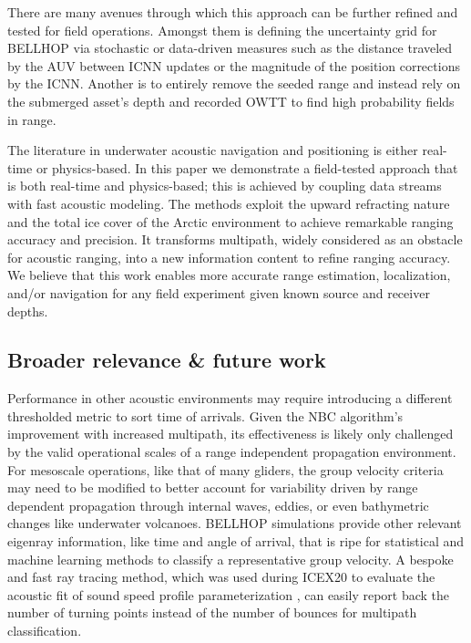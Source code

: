 There are many avenues through which this approach can be further refined and tested for field operations.
Amongst them is defining the uncertainty grid for BELLHOP via stochastic or data-driven measures such as the distance traveled by the AUV between ICNN updates or the magnitude of the position corrections by the ICNN.
Another is to entirely remove the seeded range and instead rely on the submerged asset's depth and recorded OWTT to find high probability fields in range.

The literature in underwater acoustic navigation and positioning is either real-time or physics-based.
In this paper we demonstrate a field-tested approach that is both real-time and physics-based; this is achieved by coupling data streams with fast acoustic modeling.
The methods exploit the upward refracting nature and the total ice cover of the Arctic environment to achieve remarkable ranging accuracy and precision.
It transforms multipath, widely considered as an obstacle for acoustic ranging, into a new information content to refine ranging accuracy.
We believe that this work enables more accurate range estimation, localization, and/or navigation for any field experiment given known source and receiver depths.

\subsection{Broader relevance \& future work}

Performance in other acoustic environments may require introducing a different thresholded metric to sort time of arrivals.
Given the NBC algorithm's improvement with increased multipath, its effectiveness is likely only challenged by the valid operational scales of a range independent propagation environment.
For mesoscale operations, like that of many gliders, the group velocity criteria may need to be modified to better account for variability driven by range dependent propagation through internal waves, eddies, or even bathymetric changes like underwater volcanoes.
BELLHOP simulations provide other relevant eigenray information, like time and angle of arrival, that is ripe for statistical and machine learning methods to classify a representative group velocity.
A bespoke and fast ray tracing method, which was used during ICEX20 to evaluate the acoustic fit of sound speed profile parameterization \citep{bhatt_embedded_2021}, can easily report back the number of turning points instead of the number of bounces for multipath classification.

